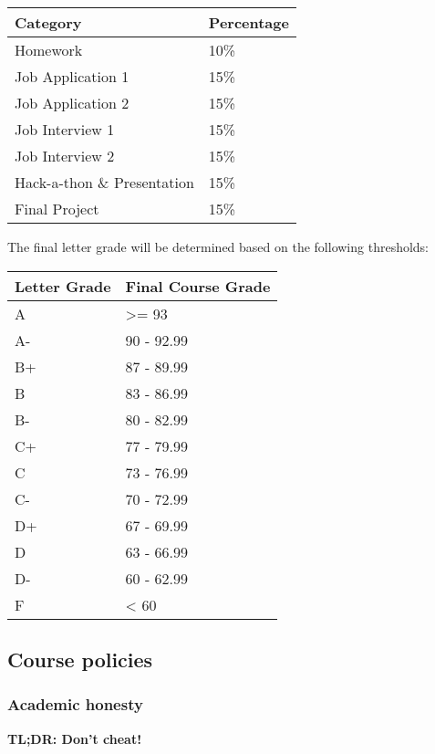 \documentclass[
  letterpaper,
  DIV=11,
  numbers=noendperiod]{scrartcl}
\begin{document}
\begin{longtable}[]{@{}ll@{}}
\toprule\noalign{}
Category & Percentage \\
\midrule\noalign{}
\endhead
\bottomrule\noalign{}
\endlastfoot
Homework & 10\% \\
Job Application 1 & 15\% \\
Job Application 2 & 15\% \\
Job Interview 1 & 15\% \\
Job Interview 2 & 15\% \\
Hack-a-thon \& Presentation & 15\% \\
Final Project & 15\% \\
\end{longtable}

The final letter grade will be determined based on the following
thresholds:

\begin{longtable}[]{@{}ll@{}}
\toprule\noalign{}
Letter Grade & Final Course Grade \\
\midrule\noalign{}
\endhead
\bottomrule\noalign{}
\endlastfoot
A & \textgreater= 93 \\
A- & 90 - 92.99 \\
B+ & 87 - 89.99 \\
B & 83 - 86.99 \\
B- & 80 - 82.99 \\
C+ & 77 - 79.99 \\
C & 73 - 76.99 \\
C- & 70 - 72.99 \\
D+ & 67 - 69.99 \\
D & 63 - 66.99 \\
D- & 60 - 62.99 \\
F & \textless{} 60 \\
\end{longtable}

\subsection{Course policies}\label{course-policies}

\subsubsection{Academic honesty}\label{academic-honesty}

\textbf{TL;DR: Don't cheat!}
\end{document}
